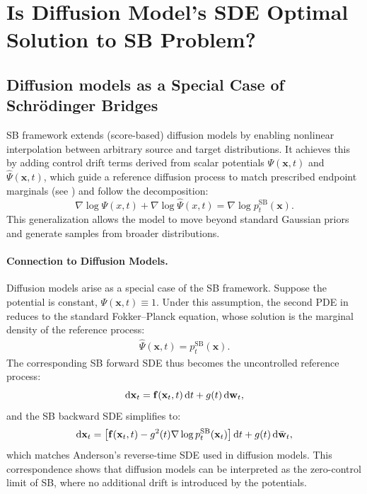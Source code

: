 \newpage

\section{Is Diffusion Model's SDE Optimal Solution to SB Problem?}\label{sec:dm-and-sb}


\subsection{Diffusion models as a Special Case of Schrödinger Bridges}

SB framework extends (score-based) diffusion models by enabling nonlinear interpolation between arbitrary source and target distributions. It achieves this by adding control drift terms derived from scalar potentials $\Psi(\mathbf{x}, t)$ and $\widehat{\Psi}(\mathbf{x}, t)$, which guide a reference diffusion process to match prescribed endpoint marginals (see ) and follow the decomposition:
\[
\nabla\log{\Psi(x,t)}+\nabla\log{\hat{\Psi}(x,t)}=\nabla \log p_t^{\mathrm{SB}}(\mathbf{x}).
\]
This generalization allows the model to move beyond standard Gaussian priors and generate samples from broader distributions.

\paragraph{Connection to Diffusion Models.}

Diffusion models arise as a special case of the SB framework. Suppose the potential is constant, $\Psi(\mathbf{x}, t) \equiv 1$. Under this assumption, the second PDE in  reduces to the standard Fokker–Planck equation, whose solution is the marginal density of the reference process:
\begin{align}\label{eq:sb-backward-potential}
    \widehat{\Psi}(\mathbf{x}, t) = p_t^{\mathrm{SB}}(\mathbf{x}).
\end{align}
The corresponding SB forward SDE thus becomes the uncontrolled reference process:
\[
    \mathop{}\!\mathrm{d}\mathbf{x}_t = \mathbf{f}(\mathbf{x}_t, t)\mathop{}\!\mathrm{d} t + g(t)\mathop{}\!\mathrm{d}\mathbf{w}_t,
\]
and the SB backward SDE simplifies to:
\[
    \mathop{}\!\mathrm{d}\mathbf{x}_t = \left[\mathbf{f}(\mathbf{x}_t, t) - g^2(t) \nabla \log p_t^{\mathrm{SB}}(\mathbf{x}_t) \right]\mathop{}\!\mathrm{d} t + g(t)\mathop{}\!\mathrm{d}\bar{\mathbf{w}}_t,
\]
which matches Anderson’s reverse-time SDE used in diffusion models. This correspondence shows that diffusion models can be interpreted as the zero-control limit of SB, where no additional drift is introduced by the potentials.

